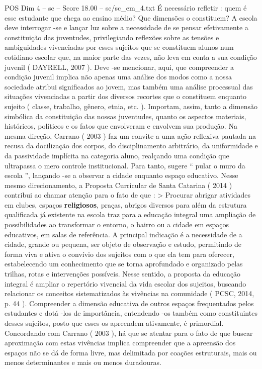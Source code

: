 \begin{textsample}{POS Dim 4 – sc – Score 18.00 – sc/sc\_em\_4.txt}
É necessário refletir : quem é esse estudante que chega ao ensino médio?
Que dimensões o constituem?
A escola deve interrogar -se e lançar luz sobre a necessidade de se pensar efetivamente a constituição das juventudes, privilegiando reflexões sobre as tensões e ambiguidades vivenciadas por esses sujeitos que se constituem alunos num cotidiano escolar que, na maior parte das vezes, não leva em conta a sua condição juvenil ( DAYRELL, 2007 ).
Deve -se mencionar, aqui, que compreender a condição juvenil implica não apenas uma análise dos modos como a nossa sociedade atribui significados ao jovem, mas também uma análise processual das situações vivenciadas a partir dos diversos recortes que o constituem enquanto sujeito ( classe, trabalho, gênero, etnia, etc. ).
Importam, assim, tanto a dimensão simbólica da constituição das nossas juventudes, quanto os aspectos materiais, históricos, políticos e os fatos que envolveram e envolvem sua produção.
Na mesma direção, Carrano ( 2003 ) faz um convite a uma ação reflexiva pautada na recusa da docilização dos corpos, do disciplinamento arbitrário, da uniformidade e da passividade implícita na categoria aluno, realçando uma condição que ultrapassa o mero controle institucional.
Para tanto, sugere “ pular o muro da escola ”, lançando -se a observar a cidade enquanto espaço educativo.
Nesse mesmo direcionamento, a Proposta Curricular de Santa Catarina ( 2014 ) contribui ao chamar atenção para o fato de que : > Procurar abrigar atividades em clubes, espaços \textbf{religiosos}, praças, abrigos diversos para além da estrutura qualificada já existente na escola traz para a educação integral uma ampliação de possibilidades ao transformar o entorno, o bairro ou a cidade em espaços educativos, em salas de referência.
A principal indicação é a necessidade de a cidade, grande ou pequena, ser objeto de observação e estudo, permitindo de forma viva e ativa o convívio dos sujeitos com o que ela tem para oferecer, estabelecendo um conhecimento que se torna aprofundado e organizado pelas trilhas, rotas e intervenções possíveis.
Nesse sentido, a proposta da educação integral é ampliar o repertório vivencial da vida escolar dos sujeitos, buscando relacionar os conceitos sistematizados às vivências na comunidade ( PCSC, 2014, p. 44 ).
Compreender a dimensão educativa de outros espaços frequentados pelos estudantes e dotá -los de importância, entendendo -os também como constituintes desses sujeitos, posto que esses os apreendem ativamente, é primordial.
Concordando com Carrano ( 2003 ), há que se atentar para o fato de que buscar aproximação com estas vivências implica compreender que a apreensão dos espaços não se dá de forma livre, mas delimitada por coações estruturais, mais ou menos determinantes e mais ou menos duradouras.

\end{textsample}
